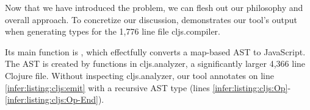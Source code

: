 \label{infer:sec:overview}

Now that we have introduced the problem,
we can flesh out our philosophy and overall
approach. To concretize our discussion,
 demonstrates our tool's output
when generating types for the 1,776 line file cljs.compiler.

Its main function is , which
effectfully converts a map-based AST
to JavaScript.
The AST is created by functions in cljs.analyzer,
a significantly larger 4,366 line Clojure file.
Without inspecting cljs.analyzer,
our tool annotates  on line \ref{infer:listing:cljs:emit}
with a recursive AST type  (lines \ref{infer:listing:cljs:Op}-\ref{infer:listing:cljs:Op-End}).

%




